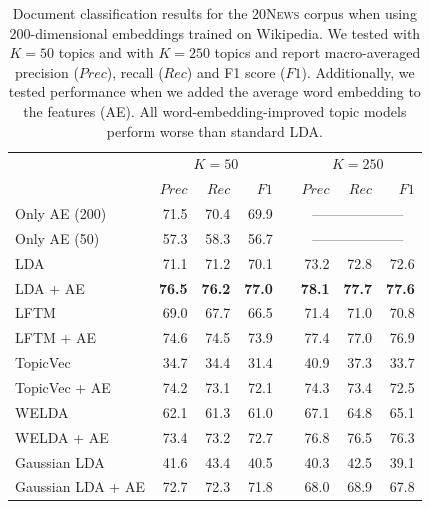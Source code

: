 \documentclass[
        a4paper,
        titlepage,
        twoside,
        parskip,
        numbers=noenddot
        ]{scrbook}
\newcommand{\ra}[1]{\renewcommand{\arraystretch}{#1}}
\theoremstyle{break}
\begin{document}
\begin{table}[]
  \ra{1.3}
  \centering
  \caption{Document classification results for the \textsc{20News} corpus when using 200-dimensional embeddings trained on Wikipedia.
  We tested with $K = 50$ topics and with $K = 250$ topics and report macro-averaged precision ($Prec$), recall ($Rec$) and F1 score ($F1$).
  Additionally, we tested performance when we added the average word embedding to the features (AE).
  All word-embedding-improved topic models perform worse than standard LDA.}
  \label{table:document_classification_dim-200}
  \begin{tabular}{lrrrcrrr}
    \toprule
    \multirow{2}{*}{} & \multicolumn{3}{c}{$K = 50$} & \phantom{a} & \multicolumn{3}{c}{$K = 250$} \\ \cmidrule{2-4} \cmidrule{6-8}
                      & $Prec$    & $Rec$     & $F1$     && $Prec$    & $Rec$   & $F1$     \\ \midrule
                      Only AE (200)     & 71.5    & 70.4    & 69.9   && \multicolumn{3}{c}{--------------------}        \\
                      Only AE (50)      & 57.3    & 58.3    & 56.7   && \multicolumn{3}{c}{--------------------}        \\
                      LDA               & 71.1    & 71.2    & 70.1   && 73.2    & 72.8     & 72.6   \\
                      LDA + AE          & \textbf{76.5}    & \textbf{76.2}    & \textbf{77.0}   && \textbf{78.1}    & \textbf{77.7}     & \textbf{77.6}   \\
                      LFTM              & 69.0    & 67.7    & 66.5   && 71.4    & 71.0     & 70.8   \\
                      LFTM + AE         & 74.6    & 74.5    & 73.9   && 77.4    & 77.0     & 76.9   \\
                      TopicVec          & 34.7    & 34.4    & 31.4   && 40.9    & 37.3     & 33.7   \\
                      TopicVec + AE     & 74.2    & 73.1    & 72.1   && 74.3    & 73.4     & 72.5   \\
                      WELDA             & 62.1    & 61.3    & 61.0   && 67.1    & 64.8     & 65.1   \\
                      WELDA + AE        & 73.4    & 73.2    & 72.7   && 76.8    & 76.5     & 76.3   \\
                      Gaussian LDA      & 41.6    & 43.4    & 40.5   && 40.3    & 42.5     & 39.1   \\
                      Gaussian LDA + AE & 72.7    & 72.3    & 71.8   && 68.0    & 68.9     & 67.8   \\
  \bottomrule
  \end{tabular}
\end{table}
\end{document}
